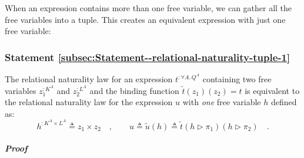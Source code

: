 When an expression contains more than one free variable, we can gather
all the free variables into a tuple. This creates an equivalent expression
with just one free variable:

\subsubsection{Statement \label{subsec:Statement--relational-naturality-tuple-1}\ref{subsec:Statement--relational-naturality-tuple-1} }

The relational naturality law for an expression $t^{:\forall A.\,Q^{A}}$
containing two free variables $z_{1}^{:K^{A}}$ and $z_{2}^{:L^{A}}$
and the binding function $\tilde{t}(z_{1})(z_{2})=t$ is equivalent
to the relational naturality law for the expression $u$ with \emph{one}
free variable $h$ defined as:
\[
h^{:K^{A}\times L^{A}}\triangleq z_{1}\times z_{2}\quad,\quad\quad u\triangleq\tilde{u}(h)\triangleq\tilde{t}(h\triangleright\pi_{1})(h\triangleright\pi_{2})\quad.
\]


\subparagraph{Proof}

